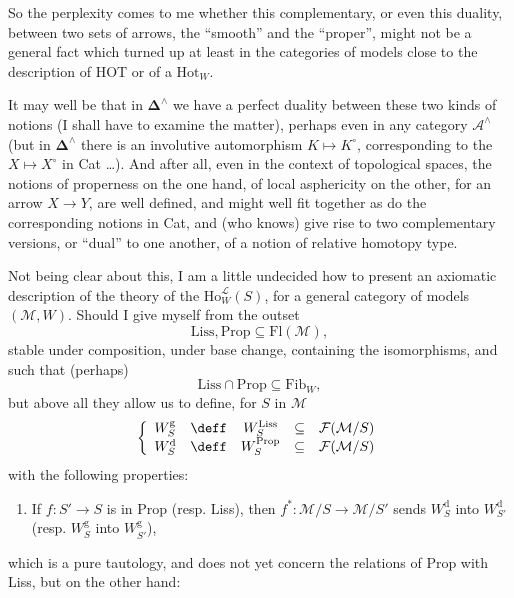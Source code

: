 So the perplexity comes to me whether this complementary, or even this duality, between two sets of arrows, the ``smooth'' and the ``proper'', might not be a general fact which turned up at least in the categories of models close to the description of HOT or of a $\mathrm{Hot}_W$.


It may well be that in $\boldsymbol{\Delta}^\wedge$ we have a perfect duality between these two kinds of notions (I shall have to examine the matter), perhaps even in any category $\mathcal{A}^\wedge$ (but in $\boldsymbol{\Delta}^\wedge$ there is an involutive automorphism $K \longmapsto K^\circ$, corresponding to the $X \longmapsto X^\circ$ in Cat \dots). And after all, even in the context of topological spaces, the notions of properness on the one hand, of local asphericity on the other, for an arrow $X \longrightarrow Y$, are well defined, and might well fit together as do the corresponding notions in Cat, and (who knows) give rise to two complementary versions, or ``dual'' to one another, of a notion of relative homotopy type.

Not being clear about this, I am a little undecided how to present an axiomatic description of the theory of the $\mathrm{Ho}^{\mathcal{L}}_W(S)$, for a general category of models $(\mathcal{M},W)$. Should I give myself from the outset
\[
\mathrm{Liss}, \mathrm{Prop} \subseteq \mathrm{Fl}(\mathcal{M}),
\]
stable under composition, under base change, containing the isomorphisms, and such that (perhaps)
\[
\mathrm{Liss} \cap \mathrm{Prop} \subseteq \mathrm{Fib}_W,
\]
but above all they allow us to define, for $S$ in $\mathcal{M}$
\[
\left\{
\begin{array}{lcccl}
W^{\mathrm{g}}_S & \deff & W^{\mathrm{Liss}}_S & \subseteq & \mathcal{F}(\mathcal{M}/S)\\
W^{\mathrm{d}}_S & \deff & W^{\mathrm{Prop}}_S & \subseteq & \mathcal{F}(\mathcal{M}/S)
\end{array}
\right.
\]
with the following properties:

\begin{enumerate}
\item[{\circled{a}}] If $f : S' \longrightarrow S$ is in Prop (resp. Liss), then $f^* : \mathcal{M}/S \longrightarrow \mathcal{M}/S'$ sends $W^{\mathrm{d}}_S$ into $W^{\mathrm{d}}_{S'}$ (resp. $W^{\mathrm{g}}_S$ into $W^{\mathrm{g}}_{S'}$),
\end{enumerate}
\noindent which is a pure tautology, and does not yet concern the relations of Prop with Liss, but on the other hand:

